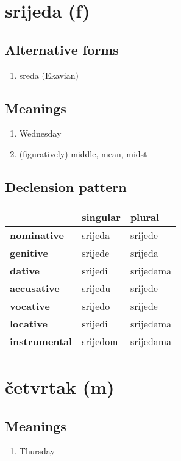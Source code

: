 \filbreak
\section{srijeda (f)}
\subsection*{Alternative forms}
\begin{enumerate}
\item sreda (Ekavian)
\end{enumerate}
\subsection*{Meanings}
\begin{enumerate}
\item Wednesday
\item (figuratively) middle, mean, midst
\end{enumerate}
\subsection*{Declension pattern}
\begin{tabularx}{\linewidth}{Xll}
\toprule
{} &  singular &     plural \\
\midrule
\textbf{nominative  } &   srijeda &    srijede \\
\textbf{genitive    } &   srijede &    srijeda \\
\textbf{dative      } &   srijedi &  srijedama \\
\textbf{accusative  } &   srijedu &    srijede \\
\textbf{vocative    } &   srijedo &    srijede \\
\textbf{locative    } &   srijedi &  srijedama \\
\textbf{instrumental} &  srijedom &  srijedama \\
\bottomrule
\end{tabularx}

\filbreak
\section{četvrtak (m)}
\subsection*{Meanings}
\begin{enumerate}
\item Thursday
\end{enumerate}

